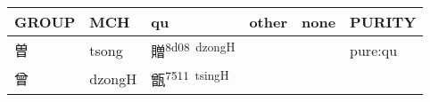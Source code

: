 \documentclass[14pt,a4paper]{scrartcl}
\begin{document}
\begin{longtable}[c]{@{}llllll@{}}
\toprule
\begin{minipage}[b]{0.14\columnwidth}\raggedright\strut
GROUP
\strut\end{minipage} &
\begin{minipage}[b]{0.14\columnwidth}\raggedright\strut
MCH
\strut\end{minipage} &
\begin{minipage}[b]{0.14\columnwidth}\raggedright\strut
qu
\strut\end{minipage} &
\begin{minipage}[b]{0.14\columnwidth}\raggedright\strut
other
\strut\end{minipage} &
\begin{minipage}[b]{0.14\columnwidth}\raggedright\strut
none
\strut\end{minipage} &
\begin{minipage}[b]{0.14\columnwidth}\raggedright\strut
PURITY
\strut\end{minipage}\tabularnewline
\midrule
\endhead
\begin{minipage}[t]{0.14\columnwidth}\raggedright\strut
曽
\strut\end{minipage} &
\begin{minipage}[t]{0.14\columnwidth}\raggedright\strut
tsong
\strut\end{minipage} &
\begin{minipage}[t]{0.14\columnwidth}\raggedright\strut
贈\textsuperscript{8d08~dzongH}
\strut\end{minipage} &
\begin{minipage}[t]{0.14\columnwidth}\raggedright\strut
\strut\end{minipage} &
\begin{minipage}[t]{0.14\columnwidth}\raggedright\strut
\strut\end{minipage} &
\begin{minipage}[t]{0.14\columnwidth}\raggedright\strut
pure:qu
\strut\end{minipage}\tabularnewline
\begin{minipage}[t]{0.14\columnwidth}\raggedright\strut
曾
\strut\end{minipage} &
\begin{minipage}[t]{0.14\columnwidth}\raggedright\strut
dzongH
\strut\end{minipage} &
\begin{minipage}[t]{0.14\columnwidth}\raggedright\strut
甑\textsuperscript{7511~tsingH}
\strut\end{minipage} &

\end{longtable}
\end{document}
